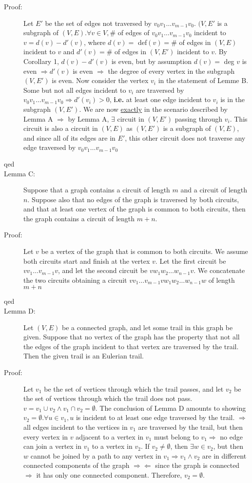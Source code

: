 \documentclass[10pt]{article}
\begin{document}
\begin{description}
		\item[Proof:] Let $E'$ be the set of edges not traversed by $v_0 v_1 \dots v_{m-1} v_0$. $(V, E'$ is a subgraph of $(V, E). \forall v \in V, \#$ of edges of $v_0 v_1 \dots v_{m-1} v_0$ incident to $v = d(v) - d'(v)$, where $d(v) =$ def$(v) = \#$ of edges in $(V, E)$ incident to $v$ and $d'(v) = \#$ of edges in $(V, E')$ incident to $v$. By Corollary 1, $d(v) - d'(v)$ is even, but by assumption $d(v) =$ deg $v$ is even $\Rightarrow d'(v)$ is even $\Rightarrow$ the degree of every vertex in the subgraph $(V, E')$ is even. Now consider the vertex $v_i$ in the statement of Lemme B. Some but not all edges incident to $v_i$ are traversed by $v_0 v_1 \dots v_{m-1} v_0 \Rightarrow d'(v_i) > 0$, \textbf{i.e.} at least one edge incident to $v_i$ is in the subgraph $(V, E')$. We are now \underline{exactly} in the scenario described by Lemma A $\Rightarrow$ by Lemma A, $\exists$ circuit in $(V, E')$   passing through $v_i$. This circuit is also a circuit in $(V, E)$ as $(V, E')$ is a subgraph of $(V, E)$, and since all of its edges are in $E'$, this other circuit does not traverse any edge traversed by $v_0 v_1 \dots v_{m-1} v_0$
		\item[qed]
		\item[Lemma C:] Suppose that a graph contains a circuit of length $m$ and a circuit of length $n$. Suppose also that no edges of the graph is traversed by both circuits, and that at least one vertex of the graph is common to both circuits, then the graph contains a circuit of length $m+n$.
		\item[Proof:] Let $v$ be a vertex of the graph that is common to both circuits. We assume both circuits start and finish at the vertex $v$. Let the first circuit be $vv_1 \dots v_{m-1} v$, and let the second circuit be $vw_1 w_2 \dots w_{n-1} v$. We concatenate the two circuits obtaining a circuit $vv_1 \dots v_{m-1}vw_1w_2 \dots w_{n-1}w$ of length $m+n$
		\item[qed]
		\item[Lemma D:] Let $(V, E)$ be a connected graph, and let some trail in this graph be given. Suppose that no vertex of the graph has the property that not all the edges of the graph incident to that vertex are traversed by the trail. Then the given trail is an Eulerian trail.
		\item[Proof:] Let $v_1$ be the set of vertices through which the trail passes, and let $v_2$ be the set of vertices through which the trail does not pass. $v=v_1 \cup v_2 \land v_1 \cap v_2 = \emptyset$. The conclusion of Lemma D amounts to showing $v_2 = \emptyset. \forall u \in v_1, u$ is incident to at least one edge traversed by the trail. $\Rightarrow$ all edges incident to the vertices in $v_1$ are traversed by the trail, but then every vertex in $v$ adjacent to a vertex in $v_1$ must belong to $v_1 \Rightarrow$ no edge can join a vertex in $v_1$ to a vertex in $v_2$. If $v_2 \neq \emptyset$, then $\exists w \in v_2$, but then $w$ cannot be joined by a path to any vertex in $v_1 \Rightarrow v_1 \land v_2$ are in different connected components of the graph $\Rightarrow \Leftarrow$ since the graph is connected $\Rightarrow$ it has only one connected component. Therefore, $v_2 = \emptyset$.

\end{description}
\end{document}
